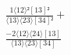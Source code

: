 \documentclass[varwidth, border=5pt]{standalone}
\begin{document}
\begin{my}
$\begin{gathered}
\scriptscriptstyle\frac{1⟨12⟩²[13]²}{⟨13⟩⟨23⟩[34]²} +\\
\scriptscriptstyle\frac{-2⟨12⟩⟨24⟩[13]}{⟨13⟩⟨23⟩[34]} \phantom{+}
\end{gathered}$
\end{my}
\end{document}
